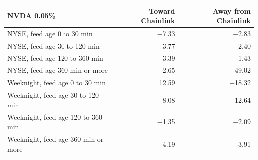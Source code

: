 \begin{tabular}{lrr}
\toprule
NVDA 0.05\% & Toward Chainlink & Away from Chainlink \\
\midrule
NYSE, feed age 0 to 30 min & $-$7.33 & $-$2.83 \\
NYSE, feed age 30 to 120 min & $-$3.77 & $-$2.40 \\
NYSE, feed age 120 to 360 min & $-$3.39 & $-$1.43 \\
NYSE, feed age 360 min or more & $-$2.65 & 49.02 \\
Weeknight, feed age 0 to 30 min & 12.59 & $-$18.32 \\
Weeknight, feed age 30 to 120 min & 8.08 & $-$12.64 \\
Weeknight, feed age 120 to 360 min & $-$1.35 & $-$2.09 \\
Weeknight, feed age 360 min or more & $-$4.19 & $-$3.91 \\
\bottomrule
\end{tabular}
